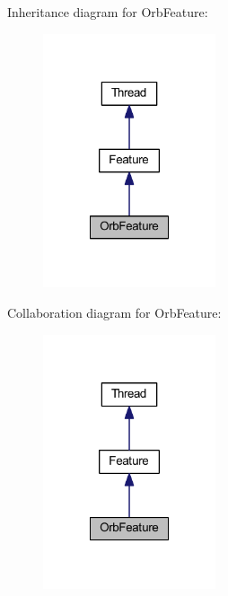 Inheritance diagram for Orb\-Feature\-:
\nopagebreak
\begin{figure}[H]
\begin{center}
\leavevmode
\includegraphics[width=144pt]{class_orb_feature__inherit__graph}
\end{center}
\end{figure}


Collaboration diagram for Orb\-Feature\-:
\nopagebreak
\begin{figure}[H]
\begin{center}
\leavevmode
\includegraphics[width=144pt]{class_orb_feature__coll__graph}
\end{center}
\end{figure}
